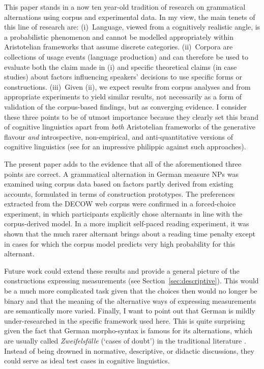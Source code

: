\documentclass[USenglish]{article}
\begin{document}
This paper stands in a now ten year-old tradition of research on grammatical alternations using corpus and experimental data.
In my view, the main tenets of this line of research are:
(i)~Language, viewed from a cognitively realistic angle, is a probabilistic phenomenon and cannot be modelled appropriately within Aristotelian frameworks that assume discrete categories.
(ii)~Corpora are collections of usage events (language production) and can therefore be used to evaluate both the claim made in (i) and specific theoretical claims (in case studies) about factors influencing speakers' decisions to use specific forms or constructions.
(iii)~Given (ii), we expect results from corpus analyses and from appropriate experiments to yield similar results, not necessarily as a form of validation of the corpus-based findings, but as converging evidence.
I consider these three points to be of utmost importance because they clearly set this brand of cognitive linguistics apart from \textit{both} Aristotelian frameworks of the generative flavour \textit{and} introspective, non-empirical, and anti-quantitative versions of cognitive linguistics (see \citealp{Dabrowska2016} for an impressive philippic against such approaches).

The present paper adds to the evidence that all of the aforementioned three points are correct.
A grammatical alternation in German measure NPs was examined using corpus data based on factors partly derived from existing accounts, formulated in terms of construction prototypes.
The preferences extracted from the DECOW web corpus were confirmed in a forced-choice experiment, in which participants explicitly chose alternants in line with the corpus-derived model.
In a more implicit self-paced reading experiment, it was shown that the much rarer alternant brings about a reading time penalty except in cases for which the corpus model predicts very high probability for this alternant.

Future work could extend these results and provide a general picture of the constructions expressing measurements (see Section~\ref{sec:descriptive}).
This would be a much more complicated task given that the choices then would no longer be binary and that the meaning of the alternative ways of expressing measurements are semantically more varied.
Finally, I want to point out that German is mildly under-researched in the specific framework used here.
This is quite surprising given the fact that German morpho-syntax is famous for its alternations, which are usually called \textit{Zweifelsfälle} (`cases of doubt') in the traditional literature \citep{Duden09,Klein2009}.
Instead of being drowned in normative, descriptive, or didactic discussions, they could serve as ideal test cases in cognitive linguistics.
\end{document}
